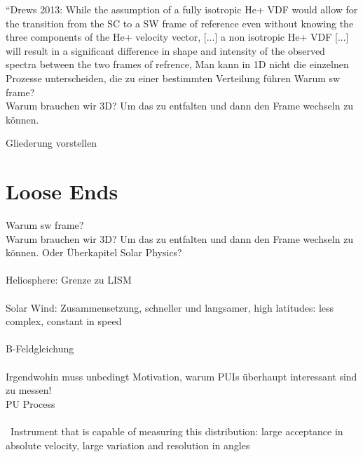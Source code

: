 “Drews 2013: While the assumption of a fully isotropic He+ VDF would allow for the transition from the SC to a SW frame of reference even without knowing the three components of the He+ velocity vector, [...] a non isotropic He+ VDF [...] will result in a significant difference in shape and intensity of the observed spectra between the two frames of refrence,
Man kann in 1D nicht die einzelnen Prozesse unterscheiden, die zu einer bestimmten Verteilung führen
Warum sw frame?\\
Warum brauchen wir 3D? Um das zu entfalten und dann den Frame wechseln zu können.





Gliederung vorstellen


\section{Loose Ends}
Warum sw frame?\\
Warum brauchen wir 3D? Um das zu entfalten und dann den Frame wechseln zu können.
Oder Überkapitel Solar Physics?
\\ \\
Heliosphere: Grenze zu LISM
\\ \\
Solar Wind: Zusammensetzung, schneller und langsamer, high latitudes: less complex, constant in speed \\ \\
B-Feldgleichung
\\ \\
Irgendwohin muss unbedingt Motivation, warum PUIs überhaupt interessant sind zu messen!
\\
PU Process\\ \\\
Instrument that is capable of measuring this distribution: large acceptance in absolute velocity, large variation and resolution in angles
